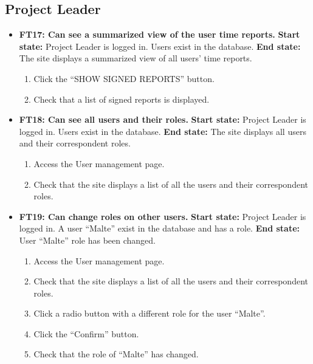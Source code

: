 \documentclass{article}
\begin{document}
\subsection{Project Leader}
\begin{itemize}
		\item \textbf{FT17: Can see a summarized view of the user time reports.}\newline
		\textbf{Start state:} Project Leader is logged in. Users exist in the database.\newline
		\textbf{End state:} The site displays a summarized view of all users' time reports.
		\begin{enumerate}
			\item Click the “SHOW SIGNED REPORTS” button.
			\item Check that a list of signed reports is displayed.
		\end{enumerate}
		
		\item \textbf{FT18: Can see all users and their roles.}\newline
		\textbf{Start state:} Project Leader is logged in. Users exist in the database.  \newline
		\textbf{End state:} The site displays all users and their correspondent roles.
		\begin{enumerate}
			\item Access the User management page.
			\item Check that the site displays a list of all the users and their correspondent roles. 
		\end{enumerate}
		
		\item \textbf{FT19: Can change roles on other users.}\newline
		\textbf{Start state:} Project Leader is logged in. A user “Malte” exist in the database and has a role.\newline
		\textbf{End state:} User “Malte” role has been changed.
		\begin{enumerate}
			\item Access the User management page.
			\item Check that the site displays a list of all the users and their correspondent roles.
			\item Click a radio button with a different role for the user “Malte”.
			\item Click the “Confirm” button.
			\item Check that the role of “Malte” has changed. 
		\end{enumerate}
		

\end{itemize}
\end{document}
